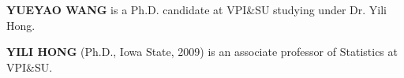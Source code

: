 \documentclass{scspaperproc}
\theoremstyle{scsthe}
\begin{document}
\textbf{\uppercase{Yueyao Wang}} is a Ph.D. candidate at VPI\&SU
studying under Dr. Yili Hong. 

\textbf{\uppercase{Yili Hong}} (Ph.D., Iowa State, 2009) is an
associate professor of Statistics at VPI\&SU. 





\end{document}
